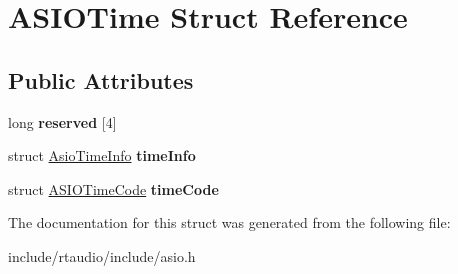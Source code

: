 \hypertarget{struct_a_s_i_o_time}{}\section{A\+S\+I\+O\+Time Struct Reference}
\label{struct_a_s_i_o_time}
\subsection*{Public Attributes}
\begin{DoxyCompactItemize}
\item 
long {\bfseries reserved} \mbox{[}4\mbox{]}\hypertarget{struct_a_s_i_o_time_a147265ab455d2f9bfe3d28bbbcc6cb34}{}\label{struct_a_s_i_o_time_a147265ab455d2f9bfe3d28bbbcc6cb34}

\item 
struct \hyperlink{struct_asio_time_info}{Asio\+Time\+Info} {\bfseries time\+Info}\hypertarget{struct_a_s_i_o_time_a3faf7d73655816a70182d3ba79d9cd50}{}\label{struct_a_s_i_o_time_a3faf7d73655816a70182d3ba79d9cd50}

\item 
struct \hyperlink{struct_a_s_i_o_time_code}{A\+S\+I\+O\+Time\+Code} {\bfseries time\+Code}\hypertarget{struct_a_s_i_o_time_a31b3730174cd23fc77ae781488a7768b}{}\label{struct_a_s_i_o_time_a31b3730174cd23fc77ae781488a7768b}

\end{DoxyCompactItemize}


The documentation for this struct was generated from the following file\+:\begin{DoxyCompactItemize}
\item 
include/rtaudio/include/asio.\+h\end{DoxyCompactItemize}
